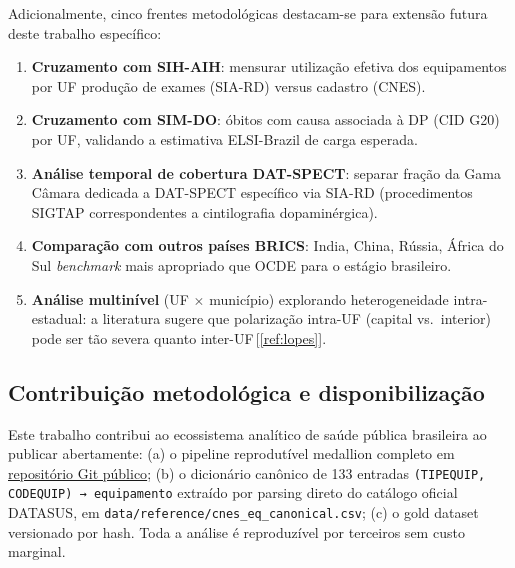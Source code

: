 \documentclass[12pt,a4paper,oneside]{article}
\begin{document}
Adicionalmente, cinco frentes metodológicas destacam-se para
extensão futura deste trabalho específico:

\begin{enumerate}
\item \textbf{Cruzamento com SIH-AIH}: mensurar utilização efetiva
dos equipamentos por UF \textemdash{} produção de exames (SIA-RD)
versus cadastro (CNES).
\item \textbf{Cruzamento com SIM-DO}: óbitos com causa associada à
DP (CID G20) por UF, validando a estimativa ELSI-Brazil de carga
esperada.
\item \textbf{Análise temporal de cobertura DAT-SPECT}: separar
fração da Gama Câmara dedicada a DAT-SPECT específico via SIA-RD
(procedimentos SIGTAP correspondentes a cintilografia
dopaminérgica).
\item \textbf{Comparação com outros países BRICS}: India, China,
Rússia, África do Sul \textemdash{} \textit{benchmark} mais
apropriado que OCDE para o estágio brasileiro.
\item \textbf{Análise multinível} (UF $\times$ município) explorando
heterogeneidade intra-estadual: a literatura sugere que polarização
intra-UF (capital vs.\ interior) pode ser tão severa quanto
inter-UF\,[\ref{ref:lopes}].
\end{enumerate}

\subsection{Contribuição metodológica e disponibilização}

Este trabalho contribui ao ecossistema analítico de saúde pública
brasileira ao publicar abertamente: (a) o pipeline reprodutível
medallion completo em
\href{https://github.com/leonardochalhoub/mirante-dos-dados-br}{repositório
Git público}; (b) o dicionário canônico de 133 entradas
\texttt{(TIPEQUIP, CODEQUIP) → equipamento} extraído por parsing
direto do catálogo oficial DATASUS, em
\texttt{data/reference/cnes\_eq\_canonical.csv};  (c) o gold dataset
versionado por hash. Toda a análise é reproduzível por terceiros sem
custo marginal.

\end{document}
